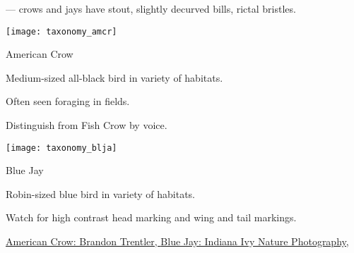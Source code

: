 \documentclass[t]{beamer}
\newcommand{\backoneline}{\vspace{-\baselineskip}}
\begin{document}
\begin{frame}{ — crows and jays have stout, slightly decurved bills, rictal bristles.}
	
	\backoneline
	\begin{multicols}{2}
		
		\texttt{[image: taxonomy\_amcr]}
		
		American Crow
		
		\medskip
		
		Medium-sized all-black bird in variety of habitats.
		
		\smallskip
		
		Often seen foraging in fields.
		
		\smallskip
		
		Distinguish from Fish Crow by voice.
		
		\columnbreak
		
		\texttt{[image: taxonomy\_blja]}
		
		Blue Jay
		
		\medskip
		
		Robin-sized blue bird in variety of habitats.
		
		\smallskip
		
		Watch for high contrast head marking and wing and tail markings.
		
		\smallskip
		
		
	\end{multicols}
	
	\vfilll
	
	\tiny  \href{https://flickr.com/photos/btrentler/13551831983}{American Crow: Brandon Trentler, } \hfill  \href{https://flickr.com/photos/indianaivy/2980015664}{Blue Jay: Indiana Ivy Nature Photography, }
	
\end{frame}
\end{document}
